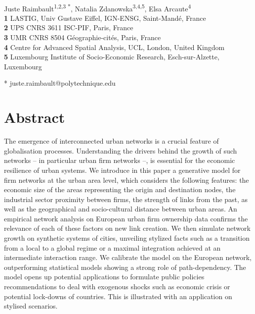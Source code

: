 \documentclass[10pt,letterpaper]{article}
\begin{document}
\justify
\vspace*{0.2in}

\begin{flushleft}
{\Large
\textbf{} %
}
\newline
\\
Juste Raimbault\textsuperscript{1,2,3 *},
Natalia Zdanowska\textsuperscript{3,4,5},
Elsa Arcaute\textsuperscript{4}
\\
\bigskip
\textbf{1} LASTIG, Univ Gustave Eiffel, IGN-ENSG, Saint-Mand{\'e}, France
\\
\textbf{2} UPS CNRS 3611 ISC-PIF, Paris, France
\\
\textbf{3} UMR CNRS 8504 G{\'e}ographie-cit{\'e}s, Paris, France
\\
\textbf{4} Centre for Advanced Spatial Analysis, UCL, London, United Kingdom
\\
\textbf{5} Luxembourg Institute of Socio-Economic Research, Esch-sur-Alzette, Luxembourg

\bigskip

* juste.raimbault@polytechnique.edu

\end{flushleft}


\section*{Abstract}
The emergence of interconnected urban networks is a crucial feature of globalisation processes. Understanding the drivers behind the growth of such networks -- in particular urban firm networks --, is essential for the economic resilience of urban systems. We introduce in this paper a generative model for firm networks at the urban area level, which considers the following features: the economic size of the areas representing the origin and destination nodes, the industrial sector proximity between firms, the strength of links from the past, as well as the geographical and socio-cultural distance between urban areas. An empirical network analysis on European urban firm ownership data confirms the relevance of each of these factors on new link creation. We then simulate network growth on synthetic systems of cities, unveiling stylized facts such as a transition from a local to a global regime or a maximal integration achieved at an intermediate interaction range. We calibrate the model on the European network, outperforming statistical models showing a strong role of path-dependency. The model opens up potential applications to formulate public policies recommendations to deal with exogenous shocks such as economic crisis or potential lock-downs of countries. This is illustrated with an application on stylised scenarios.
\end{document}
